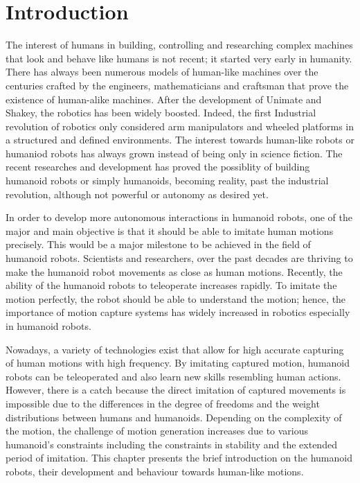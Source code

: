 \chapter{Introduction}

The interest of humans in building, controlling and researching complex machines that look and behave like humans is not 
recent; it started very early in humanity. There has always been numerous models of human-like machines over the centuries 
crafted by the engineers, mathematicians and craftsman that prove the existence of human-alike machines. After the development 
of Unimate and Shakey, the robotics has been widely boosted. Indeed, the first Industrial revolution of robotics only considered 
arm manipulators and wheeled platforms in a structured and defined environments. The interest towards human-like robots or humaniod 
robots has always grown instead of being only in science fiction. The recent researches and development has proved the possiblity
of building humanoid robots or simply humanoids, becoming reality, past the industrial revolution, although not powerful or autonomy 
as desired yet. 

 

In order to develop more autonomous interactions in humanoid robots, one of the major and main objective is that it should
be able to imitate human motions precisely. This would be a major milestone to be achieved in the field of humanoid robots.
Scientists and researchers, over the past decades are thriving to make the humanoid robot movements as close as human 
motions. Recently, the ability of the humanoid robots to teleoperate increases rapidly. To imitate the motion perfectly,
the robot should be able to understand the motion; hence, the importance of motion capture systems has widely increased
in robotics especially in humanoid robots.

 

Nowadays, a variety of technologies exist that allow for high accurate capturing of human motions with high frequency. 
By imitating captured motion, humanoid robots can be teleoperated and also learn new skills resembling human actions. 
However, there is a catch because the direct imitation of captured movements is impossible due to the differences in 
the degree of freedoms and the weight distributions between humans and humanoids. Depending on the complexity of the 
motion, the challenge of motion generation increases due to various humanoid's constraints including the constraints in 
stability and the extended period of imitation. This chapter presents the brief introduction on the humanoid robots, 
their development and behaviour towards human-like motions.


